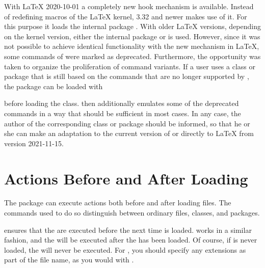 \begin{Declaration}
\end{Declaration}
With \LaTeX{} 2020-10-01 a completely new
hook mechanism is available. Instead of redefining macros of the \LaTeX{}
kernel,  3.32 and newer makes use of it. For this purpose it
loads the internal package
. With older
\LaTeX{} versions, depending on the
kernel version, either the internal package
 or
%
 is used. However, since it
was not possible to achieve identical functionality with the new mechanism in
\LaTeX, some commands of  were marked as
deprecated. Furthermore, the opportunity was taken to organize the
proliferation of command variants. If a user uses a class or package that is
still based on the commands that are no longer supported by
, the package  can be loaded with
\begin{lstcode}
  \RequirePackage[withdeprecated]{scrlfile}
\end{lstcode}
before loading the class.  then additionally emulates some
of the deprecated commands in a way that should be sufficient in most
cases. In any case, the author of the corresponding class or package should be
informed, so that he or she can make an adaptation to the current version of
 or directly to \LaTeX{} from version 2021-11-15.%
%
\EndIndexGroup

\section{Actions Before and After Loading}

The  package can execute actions both before and after
loading files. The commands used to do so distinguish between ordinary files,
classes, and packages.

\begin{Declaration}
\end{Declaration}%
 ensures that the  are executed before the
next time  is loaded.  works in a similar
fashion, and the  will be executed after the  has
been loaded. Of course, if  is never loaded, the 
will never be executed. For , you should specify any extensions as
part of the file name, as you would with .

